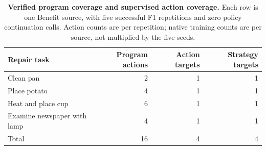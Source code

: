 \begin{table}[!htbp]
\caption{\textbf{Verified program coverage and supervised action coverage.}
Each row is one Benefit source, with five successful F1 repetitions and
zero policy continuation calls. Action counts are per repetition; native
training counts are per source, not multiplied by the five seeds.}
\label{tab:coverage}\centering\small
\begin{tabularx}{\linewidth}{Xrrr}\toprule
Repair task & Program actions & Action targets & Strategy targets\\\midrule
Clean pan & 2 & 1 & 1\\
Place potato & 4 & 1 & 1\\
Heat and place cup & 6 & 1 & 1\\
Examine newspaper with lamp & 4 & 1 & 1\\\midrule
Total & 16 & 4 & 4\\\bottomrule
\end{tabularx}
\end{table}
